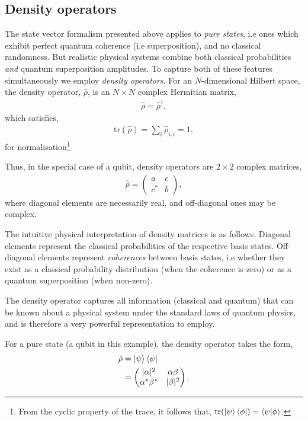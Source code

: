 \documentclass[aps,pra,twocolumn,amsmath,amssymb,nofootinbib,superscriptaddress]{revtex4}
\begin{document}
%
%

\subsection{Density operators}

The state vector formalism presented above applies to \textit{pure states}, i.e ones which exhibit perfect quantum coherence (i.e superposition), and no classical randomness. But realistic physical systems combine both classical probabilities \textit{and} quantum superposition amplitudes. To capture both of these features simultaneously we employ \textit{density operators}. For an $N$-dimensional Hilbert space, the density operator, $\hat\rho$, is an \mbox{$N\times N$} complex Hermitian matrix,
\begin{align}
	\hat\rho = \hat\rho^\dag,
\end{align}
which satisfies,
\begin{align}
\mathrm{tr}(\hat\rho)=\sum_i \hat\rho_{i,i} = 1,	
\end{align}
for normalisation\footnote{From the cyclic property of the trace, it follows that, \mbox{$\mathrm{tr}(\ket\psi\bra\phi) = \braket{\psi|\phi}$}.}

Thus, in the special case of a qubit, density operators are \mbox{$2\times 2$} complex matrices,
\begin{align}
\hat\rho = \left(\begin{matrix}{}
  a & c \nonumber\\
  c^* & b
\end{matrix}\right),
\end{align}
where diagonal elements are necessarily real, and off-diagonal ones may be complex.

The intuitive physical interpretation of density matrices is as follows. Diagonal elements represent the classical probabilities of the respective basis states. Off-diagonal elements represent \textit{coherences} between basis states, i.e whether they exist as a classical probability distribution (when the coherence is zero) or as a quantum superposition (when non-zero).

The density operator captures all information (classical and quantum) that can be known about a physical system under the standard laws of quantum physics, and is therefore a very powerful representation to employ.

For a pure state (a qubit in this example), the density operator takes the form,
\begin{align}
\hat\rho &= \ket\psi\bra\psi\nonumber\\
&= \left(\begin{matrix}{}
  |\alpha|^2 & \alpha\beta \nonumber\\
  \alpha^*\beta^* & |\beta|^2
\end{matrix}\right).
\end{align}
\end{document}
